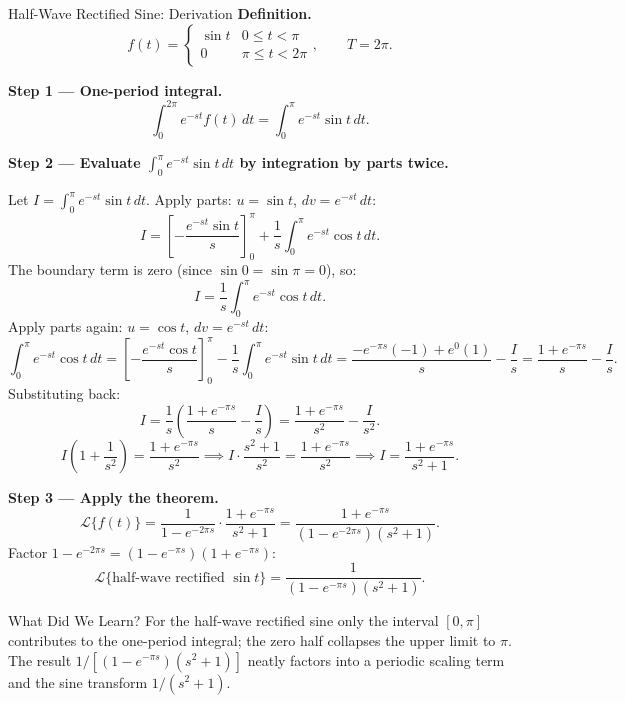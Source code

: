 \documentclass[12pt,a4paper]{article}
\begin{document}
\begin{infobox}{Half-Wave Rectified Sine: Derivation}
\textbf{Definition.}
\[
  f(t) =
  \begin{cases}
    \sin t & 0 \leq t < \pi \\
    0      & \pi \leq t < 2\pi
  \end{cases}, \qquad T = 2\pi.
\]

\textbf{Step 1 --- One-period integral.}
\[
  \int_0^{2\pi} e^{-st}f(t)\,dt = \int_0^{\pi} e^{-st}\sin t\,dt.
\]

\textbf{Step 2 --- Evaluate $\int_0^{\pi} e^{-st}\sin t\,dt$ by integration by parts twice.}

Let $I = \int_0^{\pi} e^{-st}\sin t\,dt$.  Apply parts:
$u=\sin t$, $dv=e^{-st}\,dt$:
\[
  I = \left[-\frac{e^{-st}\sin t}{s}\right]_0^{\pi}
      + \frac{1}{s}\int_0^{\pi} e^{-st}\cos t\,dt.
\]
The boundary term is zero (since $\sin 0 = \sin\pi = 0$), so:
\[
  I = \frac{1}{s}\int_0^{\pi} e^{-st}\cos t\,dt.
\]
Apply parts again: $u = \cos t$, $dv = e^{-st}\,dt$:
\[
  \int_0^{\pi} e^{-st}\cos t\,dt
  = \left[-\frac{e^{-st}\cos t}{s}\right]_0^{\pi}
    - \frac{1}{s}\int_0^{\pi} e^{-st}\sin t\,dt
  = \frac{-e^{-\pi s}(-1) + e^0(1)}{s} - \frac{I}{s}
  = \frac{1+e^{-\pi s}}{s} - \frac{I}{s}.
\]
Substituting back:
\[
  I = \frac{1}{s}\left(\frac{1+e^{-\pi s}}{s} - \frac{I}{s}\right)
    = \frac{1+e^{-\pi s}}{s^2} - \frac{I}{s^2}.
\]
\[
  I\!\left(1 + \frac{1}{s^2}\right) = \frac{1+e^{-\pi s}}{s^2}
  \implies
  I\cdot\frac{s^2+1}{s^2} = \frac{1+e^{-\pi s}}{s^2}
  \implies
  I = \frac{1+e^{-\pi s}}{s^2+1}.
\]

\textbf{Step 3 --- Apply the theorem.}
\[
  \mathcal{L}\{f(t)\}
  = \frac{1}{1-e^{-2\pi s}} \cdot \frac{1+e^{-\pi s}}{s^2+1}
  = \frac{1+e^{-\pi s}}{(1-e^{-2\pi s})(s^2+1)}.
\]
Factor $1-e^{-2\pi s} = (1-e^{-\pi s})(1+e^{-\pi s})$:
\[
  \boxed{
  \mathcal{L}\{\text{half-wave rectified }\sin t\}
  = \frac{1}{(1-e^{-\pi s})(s^2+1)}.
  }
\]
\end{infobox}

\begin{learnbox}{What Did We Learn?}
For the half-wave rectified sine only the interval $[0,\pi]$ contributes to
the one-period integral; the zero half collapses the upper limit to $\pi$.
The result $1/[(1-e^{-\pi s})(s^2+1)]$ neatly factors into a periodic
scaling term and the sine transform $1/(s^2+1)$.
\end{learnbox}

\end{document}

